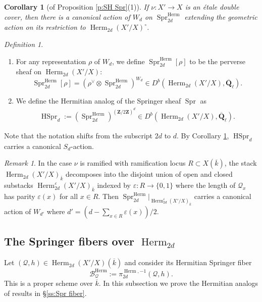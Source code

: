 \documentclass[reqno]{amsart}
\numberwithin{equation}{section}
\newcommand{\Q}{\mathbf{Q}}
\newcommand{\Z}{\mathbf{Z}}
\DeclareMathOperator{\Perv}{Perv}
\DeclareMathOperator{\Herm}{Herm}
\DeclareMathOperator{\Spr}{Spr}
\DeclareMathOperator{\HSpr}{HSpr}
\DeclareMathOperator{\SHSpr}{SHSpr}
\newcommand{\SH}{\textup{SkHm}}
\newcommand{\Qlbar}{\overline{\Q}_\ell}
\newcommand{\ov}{\overline}
\newcommand\ot{\otimes}
\renewcommand\c{\circ}
\newcommand{\e}{\varepsilon}
\newcommand{\ep}{\varepsilon}
\renewcommand{\r}{\rho}
\newcommand\cB{\mathcal{B}}
\newcommand\cQ{\mathcal{Q}}
\newtheorem{cor}[thm]{Corollary}
\theoremstyle{remark}
\newtheorem{remark}[thm]{Remark}
\newtheorem{defn}[thm]{Definition}
\numberwithin{equation}{section}
\begin{document}
\begin{cor}[of Proposition \ref{p:SH Spr}(1)]\label{c:Wd action} If $\nu:X'\to X$ is an \'etale double cover, then there is a canonical action of $W_{d}$ on $\Spr^{\Herm}_{2d}$ extending the geometric action on its restriction to $\Herm_{2d}(X'/X)^{\c}$.
\end{cor}


\begin{defn}\label{d:Spr isotypic} 
\begin{enumerate}
\item For any representation $\r$ of $W_{d}$, we define $\Spr^{\Herm}_{2d}[\r]$ to be the perverse sheaf  on $\Herm_{2d}(X'/X)$:
\begin{equation*}
\Spr^{\Herm}_{2d}[\r]=(\r^{\vee}\ot \Spr^{\Herm}_{2d})^{W_{d}}\in D^b(\Herm_{2d}(X'/X),\Qlbar).
\end{equation*}
\item We define the Hermitian  analog of the Springer sheaf $\Spr$ as
\begin{eqnarray*}
\HSpr_{d}:=(\Spr^{\Herm}_{2d})^{(\Z/2\Z)^{d}}\in D^b(\Herm_{2d}(X'/X),\Qlbar).
\end{eqnarray*}
\end{enumerate}
\end{defn}
Note that the notation shifts from the subscript $2d$ to $d$. By Corollary \ref{c:Wd action}, $\HSpr_{d}$ carries a canonical $S_{d}$-action.

\begin{remark} In the case $\nu$ is ramified with  ramification locus $R\subset X(\ov k)$, the stack $\Herm_{2d}(X'/X)_{\ov k}$ decomposes into the disjoint union of open and closed substacks $\Herm^{\ep}_{2d}(X'/X)_{\ov k}$ indexed by $\e: R\to \{0,1\}$ where the length of $\cQ_{x}$ has parity $\e(x)$ for all $x\in R$. Then $\Spr^{\Herm}_{2d}|_{\Herm^{\ep}_{2d}(X'/X)_{\ov k}}$ carries a canonical action of $W_{d'}$ where $d'=(d-\sum_{x\in R}\ep(x))/2$.  
\end{remark}


\subsection{The Springer fibers over $\Herm_{2d}$}\label{ss:Herm fiber} 
Let $(\cQ,h)\in \Herm_{2d}(X'/X)(\ov k)$ and consider its Hermitian Springer fiber
\begin{equation*}
\cB^{\Herm}_{\cQ}:=\pi^{\Herm,-1}_{2d}(\cQ,h).
\end{equation*}
This is a proper scheme over $\ov k$. In this subsection we prove the Hermitian analogs of results in \S\ref{ss:Spr fiber}.
\end{document}

